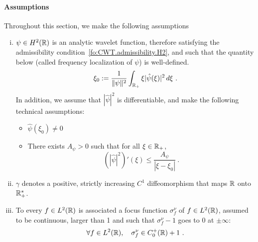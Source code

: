 \paragraph{Assumptions}
Throughout this section, we make the following assumptions
\begin{enumerate}[i.]
\item 
$\psi\in H^2(\mathbb{R})$ is an analytic wavelet function, therefore satisfying the admissibility condition~\eqref{fo:CWT.admissibility.H2}, and such that the quantity below (called frequency localization of $\psi$) is well-defined.
\label{FFTFT.assumption.psi}
\begin{equation}
\label{eq_wavelet_freq_loc}
\xi_0 := \frac{1}{\|\psi\|^2}\int_{\R_+} \xi |\hat\psi(\xi)|^2\,d\xi\ .    
\end{equation}
In addition, we assume that $|\hat\psi|^2$ is differentiable, and make the following technical assumptions:
\begin{itemize}
\item
$\hat\psi(\xi_0)\ne 0$
\item 
There exists $A_\psi>0$ such that for all $\xi\in\mathbb{R}_+$, 
\begin{equation}
\label{eq_hypothesis_psi}
\left(|\hat\psi|^2\right)'(\xi) \le \frac{A_\psi}{|\xi-\xi_0|}\ .
\end{equation}
\end{itemize}
\item
$\gamma$ denotes a positive, strictly increasing $C^1$ diffeomorphism that maps $\mathbb{R}$ onto $\mathbb{R}_+^*$. 
\item
To every $f\in L^2(\mathbb{R})$ is associated a focus function $\sigma^\nu_f$ of $f\in L^2(\mathbb{R})$, assumed to be  continuous, larger than 1 and such that $\sigma_f^\nu -1$ goes to 0 at $\pm\infty$:
\begin{equation}
	\forall f\in L^2(\mathbb{R}), \quad \sigma^\nu_f \in C_{0}^+(\mathbb{R}) + 1\ .
\end{equation}
\end{enumerate}

